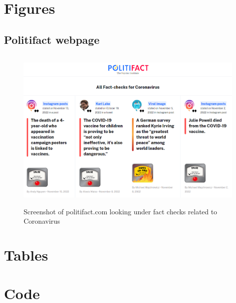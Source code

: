 \documentclass[
10pt, %
a4paper, %
oneside, %
headinclude,footinclude, %
] {book}%
\begin{document}
\section{Figures}
\label{app:figures}

\subsection{Politifact webpage}
\begin{figure}[H]
    \centering
    \includegraphics[width=20cm,height=8cm,keepaspectratio]{figures/politifact22112022.png}
    
    \caption{Screenshot of politifact.com looking under fact checks related to Coronavirus}
    \label{fig:politifact_page_content}
\end{figure}



\clearpage
\section{Tables}
\label{app:tables}


\section{Code}
\label{app:code}
\end{document}
